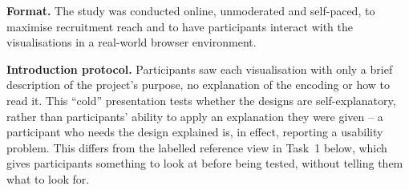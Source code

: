 \documentclass[logo,msc]{infthesis}
\begin{document}
\textbf{Format.} The study was conducted online, unmoderated and self-paced, to maximise recruitment reach and to have participants interact with the visualisations in a real-world browser environment.

\textbf{Introduction protocol.} Participants saw each visualisation with only a brief description of the project's purpose, no explanation of the encoding or how to read it. This ``cold'' presentation tests whether the designs are self-explanatory, rather than participants' ability to apply an explanation they were given -- a participant who needs the design explained is, in effect, reporting a usability problem. This differs from the labelled reference view in Task~1 below, which gives participants something to look at before being tested, without telling them what to look for.
 
\end{document}
